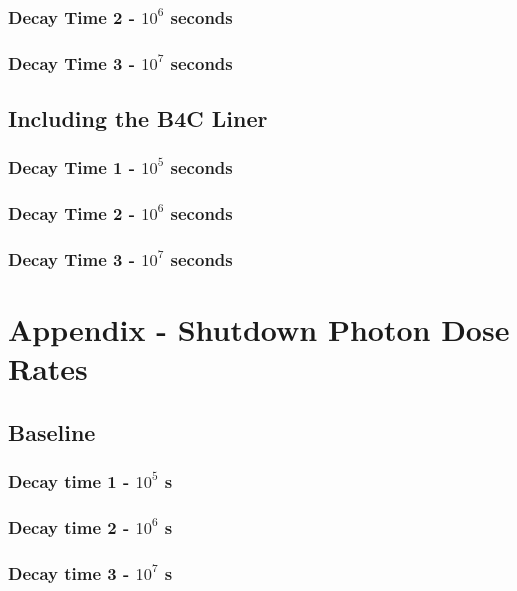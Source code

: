 \documentclass[12pt]{article}
\begin{document}
\subsubsection{Decay Time 2 - $10^{6}$ seconds}

\subsubsection{Decay Time 3 - $10^{7}$ seconds}

\subsection{Including the B4C Liner}
\label{appendix:grp_photon_src_b4c}
\subsubsection{Decay Time 1 - $10^{5}$ seconds}

\subsubsection{Decay Time 2 - $10^{6}$ seconds}

\subsubsection{Decay Time 3 - $10^{7}$ seconds}

\section{Appendix - Shutdown Photon Dose Rates}
\subsection{Baseline}
\subsubsection{Decay time 1 - $10^5$ s}

\clearpage
\subsubsection{Decay time 2 - $10^6$ s}

\clearpage
\subsubsection{Decay time 3 - $10^7$ s}

\clearpage
\end{document}
